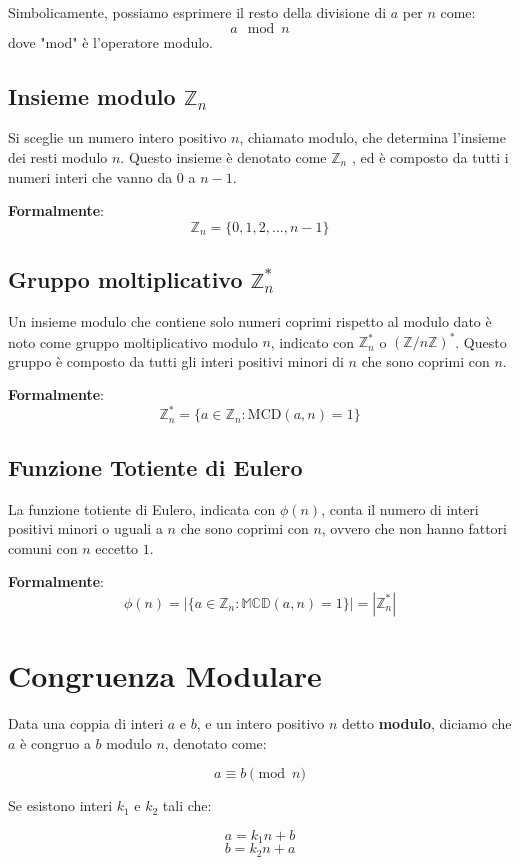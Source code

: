 \documentclass[a4paper,12pt]{report}
\begin{document}
Simbolicamente, possiamo esprimere il resto della divisione di $a$ per $n$ come:
\[ a \mod n \]
dove "mod" è l'operatore modulo.

\subsection*{Insieme modulo \( \mathbb{Z}_n\)}
Si sceglie un numero intero positivo \(n\), chiamato modulo, che determina l'insieme dei resti modulo \(n\). 
Questo insieme è denotato come \(\mathbb{Z}_n\)  , ed è composto da tutti i numeri interi che vanno da 0 a \(n-1\).

\textbf{Formalmente}: \[\mathbb{Z}_n = \{0, 1, 2, \ldots, n-1\}\]

\subsection*{Gruppo moltiplicativo \(\mathbb{Z}_n^*\)}
Un insieme modulo che contiene solo numeri coprimi rispetto al modulo dato è noto come gruppo moltiplicativo modulo \(n\), indicato con \(\mathbb{Z}_n^*\) o \((\mathbb{Z}/n\mathbb{Z})^*\). 
Questo gruppo è composto da tutti gli interi positivi minori di \(n\) che sono coprimi con \(n\).

\textbf{Formalmente}: \[\mathbb{Z}_n^* = \{a \in \mathbb{Z}_n : \text{MCD}(a, n) = 1\}\]

\subsection*{Funzione Totiente di Eulero} \label{sec:totiente}
La funzione totiente di Eulero, indicata con $\phi(n)$, conta il numero di interi positivi minori o uguali a $n$ che sono coprimi con $n$, ovvero che non hanno fattori comuni con $n$ eccetto $1$. 

\textbf{Formalmente}:\[\phi(n) = |\{a \in \mathbb{Z}_n : \mathbb{MCD}(a, n) = 1\}| = |\mathbb{Z}_n^*|\]
\section{Congruenza Modulare}

Data una coppia di interi $a$ e $b$, e un intero positivo $n$ detto \textbf{modulo}, diciamo che $a$ è congruo a $b$ modulo $n$, denotato come:

$$a \equiv b \pmod{n}$$

Se esistono interi $k_1$ e $k_2$ tali che:

$$a = k_1n + b$$
$$b = k_2n + a$$
\end{document}

